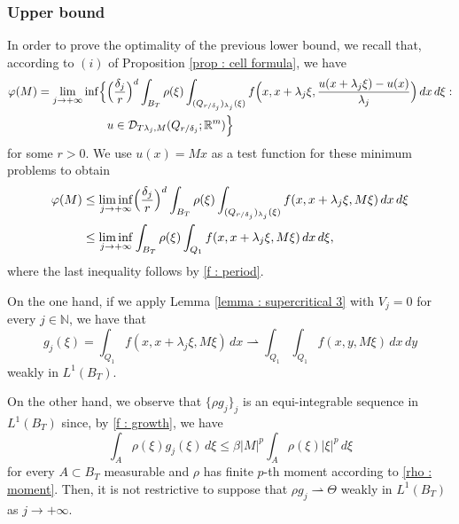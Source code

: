 \documentclass{article}
\theoremstyle{definition}
\newcommand{\f}{\varphi}
\newcommand{\dej}{\delta_j}
\newcommand{\N}{\mathbb{N}}
\newcommand{\R}{\mathbb{R}}
\begin{document}
\subsubsection{Upper bound}

In order to prove the optimality of the previous lower bound, we recall that, according to $(i)$ of Proposition \ref{prop : cell formula}, we have
\begin{align*}
    \f(M) & = \lim_{j\to+\infty} \inf\Bigl\{ \Bigl(\frac{\dej}{r}\Bigr)^d\int_{B_T} \rho(\xi)\int_{(Q_{r/\dej})_{\lambda_j}(\xi)} f\Bigl(x, x+\lambda_j\xi, \frac{u(x+\lambda_j\xi)-u(x)}{\lambda_j}\Bigr)\, dx\,d\xi : \\
    & \qquad \qquad \qquad u\in \mathcal{D}_{T\lambda_j,M}(Q_{r/\dej};\R^m) \Bigr\}
\end{align*}
for some $r>0$. We use $u(x)=Mx$ as a test function for these minimum problems to obtain
\begin{align}\nonumber
    \f(M) & \leq \liminf_{j\to+\infty} \Bigl(\frac{\dej}{r}\Bigr)^d\int_{B_T} \rho(\xi)\int_{(Q_{r/\dej})_{\lambda_j}(\xi)} f(x, x+\lambda_j\xi, M\xi)\, dx\,d\xi\\ \label{supsuper}
    & \leq \liminf_{j\to+\infty} \int_{B_T} \rho(\xi)\int_{Q_1} f(x,x+\lambda_j\xi,M\xi)\, dx\,d\xi ,
\end{align}
where the last inequality follows by \eqref{f : period}. 

On the one hand, if we apply Lemma \ref{lemma : supercritical 3} with $V_j=0$ for every $j\in \N$, we have that
\begin{equation*}
      g_j(\xi)=\int_{Q_1} f(x,x+\lambda_j\xi,M\xi)\, dx
\rightharpoonup
    \int_{Q_1} \int_{Q_1} f(x,y,M\xi)\, dx\, dy
\end{equation*}
weakly in $L^1(B_T)$. 

On the other hand, we observe that $\{\rho g_j\}_j$ is an equi-integrable sequence in $L^1(B_T)$ since, by \eqref{f : growth}, we have 
\begin{equation*}
    \int_A \rho(\xi)g_j(\xi)\,d\xi \leq \beta|M|^p \int_A\rho(\xi)|\xi|^p\,d\xi
\end{equation*}
for every $A\subset B_T$ measurable and $\rho$ has finite $p$-th moment according to \eqref{rho : moment}. Then, it is not restrictive to suppose that $\rho g_j\rightharpoonup \Theta$ weakly in $L^1(B_T)$ as $j\to+\infty$.
\end{document}
